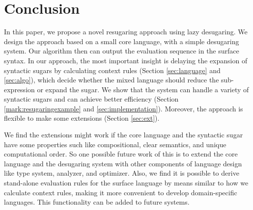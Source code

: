 \section{Conclusion}
\label{sec7}


In this paper, we propose a novel resugaring approach using lazy desugaring. We design the approach based on a small core language, with a simple desugaring system. Our algorithm then can output the evaluation sequence in the surface syntax. In our approach, the most important insight is delaying the expansion of syntactic sugars by calculating context rules (Section \ref{sec:language} and \ref{sec:algo}), which decide whether the mixed language should reduce the sub-expression or expand the sugar. We show that the system can handle a variety of syntactic sugars and can achieve better efficiency (Section \ref{mark:resugaringexample} and \ref{sec:implementation}). Moreover, the approach is flexible to make some extensions (Section \ref{sec:ext}).

We find the extensions might work if the core language and the syntactic sugar have some properties such like compositional, clear semantics, and unique computational order. So one possible future work of this is to extend the core language and the desugaring system with other components of language design like type system, analyzer, and optimizer. Also, we find it is possible to derive stand-alone evaluation rules for the surface language by means similar to how we calculate context rules, making it more convenient to develop domain-specific languages. This functionality can be added to future systems.
